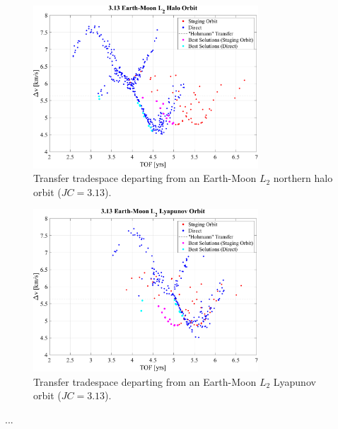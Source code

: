 \begin{figure}[ht]
    \centering
    \includegraphics[width=0.75\textwidth]{figures/TradeSpace_L2Halo_3_13.pdf}
    \caption{Transfer tradespace departing from an Earth-Moon $L_{2}$ northern halo orbit ($JC=3.13$).}
    \label{fig:lowBoth}
\end{figure}

\begin{figure}[ht]
    \centering
    \includegraphics[width=0.75\textwidth]{figures/TradeSpace_L2Lyapunov_3_13.pdf}
    \caption{Transfer tradespace departing from an Earth-Moon $L_{2}$ Lyapunov orbit ($JC=3.13$).}
    \label{fig:betterStaging}
\end{figure}

...
